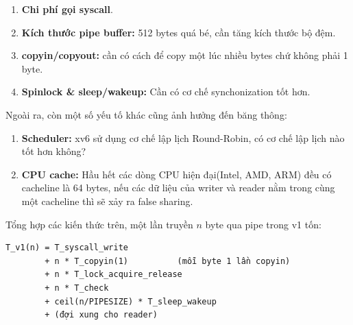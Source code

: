 \documentclass[12pt,a4paper]{article}
\newcommand{\code}[1]{\texttt{#1}}
\begin{document}
\begin{enumerate}
    \item \textbf{Chi phí gọi syscall}.
    \item \textbf{Kích thước pipe buffer:} 512 bytes quá bé, cần tăng kích thước bộ đệm.
    \item \textbf{copyin/copyout:} cần có cách để copy một lúc nhiều bytes chứ không phải 1 byte.
    \item \textbf{Spinlock \& sleep/wakeup:} Cần có cơ chế synchonization tốt hơn.
\end{enumerate}
Ngoài ra, còn một số yếu tố khác cũng ảnh hưởng đến băng thông:
\begin{enumerate}
    \item \textbf{Scheduler:} xv6 sử dụng cơ chế lập lịch Round-Robin, có cơ chế lập lịch nào tốt hơn không?  
    \item \textbf{CPU cache:} Hầu hết các dòng CPU hiện đại(Intel, AMD, ARM) đều có cacheline là 64 bytes, nếu các dữ liệu của writer và reader nằm trong cùng một cacheline thì sẽ xảy ra false sharing.
\end{enumerate}


Tổng hợp các kiến thức trên, một lần truyền $n$ byte qua pipe trong v1 tốn:

\begin{verbatim}
T_v1(n) = T_syscall_write
        + n * T_copyin(1)          (mỗi byte 1 lần copyin)
        + n * T_lock_acquire_release
        + n * T_check
        + ceil(n/PIPESIZE) * T_sleep_wakeup
        + (đợi xung cho reader)
\end{verbatim}

\end{document}
